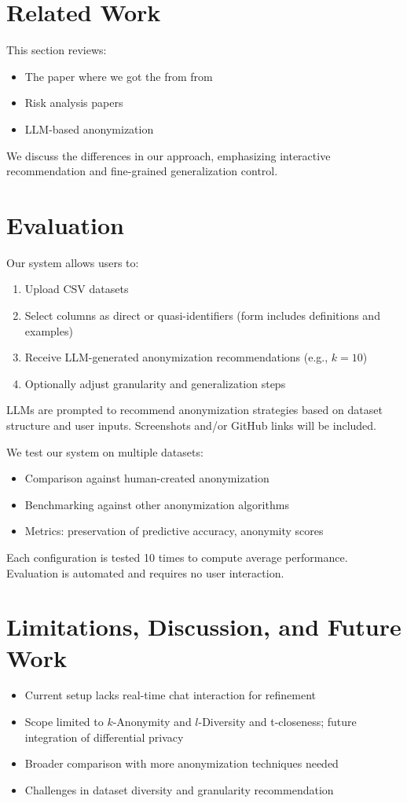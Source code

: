 \documentclass{article}
\begin{document}
\section{Related Work}
This section reviews:
\begin{itemize}
     \item The paper where we got the from from
     \item Risk analysis papers
    \item LLM-based anonymization

\end{itemize}
We discuss the differences in our approach, emphasizing interactive recommendation and fine-grained generalization control.

\section{Evaluation}
Our system allows users to:
\begin{enumerate}
    \item Upload CSV datasets
    \item Select columns as direct or quasi-identifiers (form includes definitions and examples)
    \item Receive LLM-generated anonymization recommendations (e.g., $k=10$)
    \item Optionally adjust granularity and generalization steps
\end{enumerate}
LLMs are prompted to recommend anonymization strategies based on dataset structure and user inputs. Screenshots and/or GitHub links will be included.

We test our system on multiple datasets:
\begin{itemize}
    \item Comparison against human-created anonymization
    \item Benchmarking against other anonymization algorithms
    \item Metrics: preservation of predictive accuracy, anonymity scores
\end{itemize}
Each configuration is tested 10 times to compute average performance. Evaluation is automated and requires no user interaction.

\section{Limitations, Discussion, and Future Work}
\begin{itemize}
    \item Current setup lacks real-time chat interaction for refinement
    \item Scope limited to $k$-Anonymity and $l$-Diversity and t-closeness; future integration of differential privacy
    \item Broader comparison with more anonymization techniques needed
    \item Challenges in dataset diversity and granularity recommendation
\end{itemize}
\end{document}

